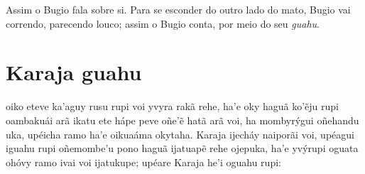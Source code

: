Assim o Bugio fala sobre si. Para se esconder do outro lado do mato,
Bugio vai correndo, parecendo louco; assim o Bugio conta, por meio do
seu \textit{guahu}.



\chapter{Karaja guahu}

 oiko eteve ka'aguy rusu rupi voi yvyra rakã rehe, ha'e oky haguã
ko'ẽju rupi oambakuái arã ikatu ete hápe peve oñe'ẽ hatã arã voi, ha
mombyrýgui oñehandu uka, upéicha ramo ha'e oikuaáma okytaha. Karaja
ijecháy naiporãi voi, upéagui iguahu rupi oñemombe'u pono haguã ijatuapẽ
rehe ojepuka, ha'e yvýrupi oguata ohóvy ramo ivai voi ijatukupe; upéare
Karaja he'i oguahu rupi:

